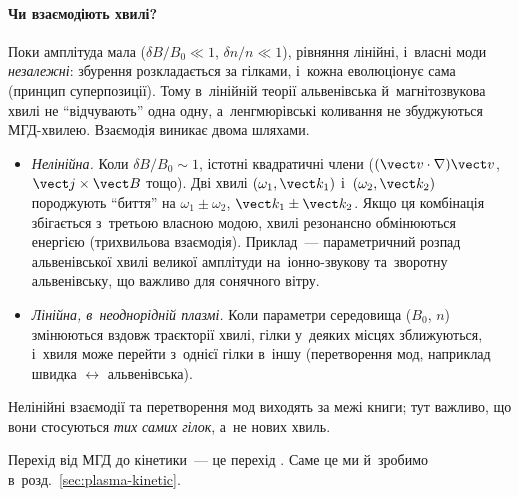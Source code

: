 \paragraph{Чи взаємодіють хвилі?}
Поки амплітуда мала ($\delta B/B_0\ll1$, $\delta n/n\ll1$), рівняння лінійні, і~власні моди \emph{незалежні}:
збурення розкладається за гілками, і~кожна еволюціонує сама (принцип суперпозиції). Тому в~лінійній теорії альвенівська й~магнітозвукова хвилі
не \enquote{відчувають} одна одну, а~ленгмюрівські коливання не збуджуються МГД-хвилею.
Взаємодія виникає двома шляхами.
\begin{itemize}
	\item \emph{Нелінійна.} Коли $\delta B/B_0\sim1$, істотні квадратичні члени ($(\vect v\cdot\nabla)\vect v$, $\vect j\times\vect B$ тощо).
	  Дві хвилі $(\omega_1,\vect k_1)$ і~$(\omega_2,\vect k_2)$ породжують \enquote{биття} на $\omega_1\pm\omega_2$, $\vect k_1\pm\vect k_2$. Якщо ця
	  комбінація збігається з~третьою власною модою, хвилі резонансно обмінюються енергією (трихвильова взаємодія). Приклад~---
	  параметричний розпад альвенівської хвилі великої амплітуди на~іонно-звукову та~зворотну альвенівську, що важливо для сонячного вітру.
	\item \emph{Лінійна, в~неоднорідній плазмі.} Коли параметри середовища ($B_0$, $n$) змінюються вздовж траєкторії хвилі, гілки
	  у~деяких місцях зближуються, і~хвиля може перейти з~однієї гілки в~іншу (перетворення мод, наприклад швидка $\leftrightarrow$ альвенівська).
\end{itemize}
Нелінійні взаємодії та перетворення мод виходять за межі книги; тут важливо, що вони стосуються \emph{тих самих гілок}, а~не нових хвиль.

Перехід від МГД до кінетики~--- це перехід . Саме це ми й~зробимо в~розд.~\ref{sec:plasma-kinetic}.



